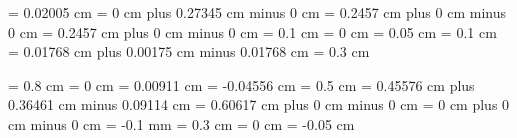 \gre@maximumspacewithoutdash = 0.02005 cm
\gre@afterclefnospace = 0 cm plus 0.27345 cm minus 0 cm
\gre@afterinitialshift = 0.2457 cm plus 0 cm minus 0 cm
\gre@beforeinitialshift = 0.2457 cm plus 0 cm minus 0 cm
\gre@minimalspaceatlinebeginning = 0.1 cm
\gre@manualinitialwidth = 0 cm
\gre@aboveinitialseparation = 0.05 cm
\gre@noclefspace = 0.1 cm
\gre@clefchangespace = 0.01768 cm plus 0.00175 cm minus 0.01768 cm%
\gre@clivisalignmentmin = 0.3 cm




\gre@abovesignsspace = 0.8 cm
\gre@belowsignsspace = 0 cm
\gre@lowchoralsignshift = 0.00911 cm
\gre@highchoralsignshift = -0.04556 cm
\gre@translationheight = 0.5 cm
\gre@spaceabovelines = 0.45576 cm plus 0.36461 cm minus 0.09114 cm
\gre@spacelinestext = 0.60617 cm plus 0 cm minus 0 cm
\gre@spacebeneathtext = 0 cm plus 0 cm minus 0 cm
\gre@abovelinestextraise = -0.1 mm%
\gre@abovelinestextheight = 0.3 cm%
\gre@braceshift = 0 cm
\gre@curlybraceaccentusshift = -0.05 cm

\makeatother